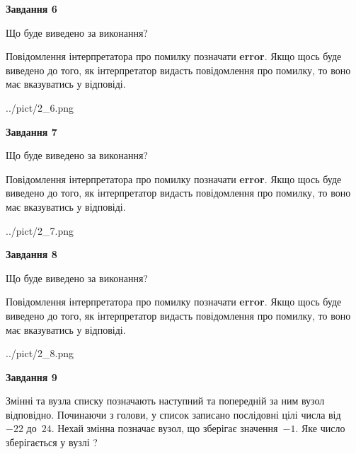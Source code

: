 \documentclass[12pt, ukrainian]{article}
\begin{document}
{\begin {large}
{\begin {center}\textbf{Завдання 6}\end {center}}\par
Що буде виведено за виконання?

Повідомлення інтерпретатора про помилку позначати \textbf{error}.
Якщо щось буде виведено до того, як інтерпретатор видасть повідомлення про помилку, 
то воно має вказуватись у відповіді. \par


\begin{center}
	{../pict/2_6.png}
\end{center}
\newpage

{\begin {center}\textbf{Завдання 7}\end {center}}\par
Що буде виведено за виконання?

Повідомлення інтерпретатора про помилку позначати \textbf{error}.
Якщо щось буде виведено до того, як інтерпретатор видасть повідомлення про помилку, 
то воно має вказуватись у відповіді. \par


\begin{center}
	{../pict/2_7.png}
\end{center}
\newpage

{\begin {center}\textbf{Завдання 8}\end {center}}\par
Що буде виведено за виконання?

Повідомлення інтерпретатора про помилку позначати \textbf{error}.
Якщо щось буде виведено до того, як інтерпретатор видасть повідомлення про помилку, 
то воно має вказуватись у відповіді. \par


\begin{center}
	{../pict/2_8.png}
\end{center}
\newpage

{\begin {center}\textbf{Завдання 9}\end {center}}\par
Змінні  та  вузла списку позначають наступний та попередній за ним вузол відповідно. Починаючи з голови, у список записано послідовні цілі числа від~$-22$ до~$24$. Нехай змінна  позначає вузол, що зберігає значення~$-1$.
Яке число зберігається у вузлі  ?\par
\newpage


\end{large}}
\end{document}
